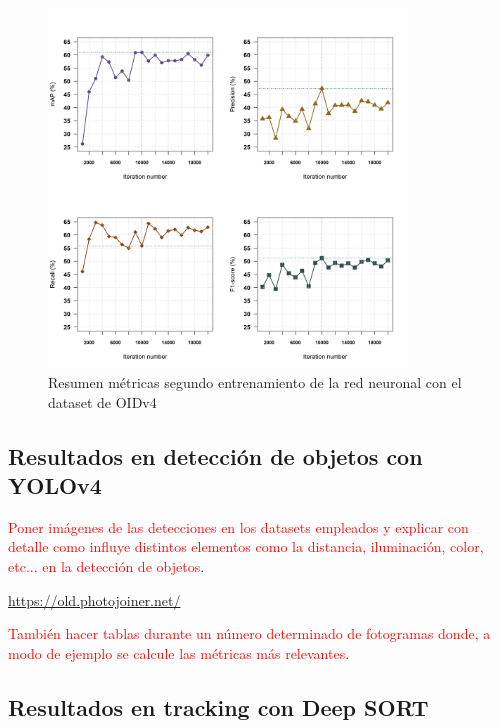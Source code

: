 \begin{figure}[ht]
\centering
\includegraphics[width=0.85\textwidth]{img/chapters/resultados/metricas/metrics-train2.png}
\caption{\label{fig:metrics-train2}Resumen métricas segundo entrenamiento de la red neuronal con el dataset de OIDv4}
\end{figure}

\newpage

\subsection{Resultados en detección de objetos con YOLOv4}
\label{subsec:resultados-yolov4-tf}

\textcolor{red}{Poner imágenes de las detecciones en los datasets empleados y explicar con detalle como influye distintos elementos como la distancia, iluminación, color, etc... en la detección de objetos}.

\url{https://old.photojoiner.net/}

\textcolor{red}{También hacer tablas durante un número determinado de fotogramas donde, a modo de ejemplo se calcule las métricas más relevantes}.

\newpage

\subsection{Resultados en tracking con Deep SORT}
\label{subsec:resultados-deepsort}

